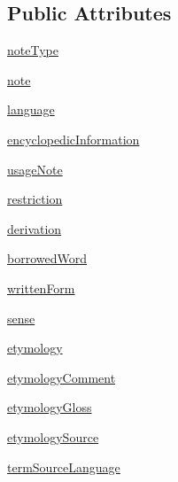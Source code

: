 \subsection*{Public Attributes}
\begin{DoxyCompactItemize}
\item 
\hyperlink{classlmf_1_1src_1_1core_1_1statement_1_1_statement_abc61d06d03119e6e12d5c3854afc93c1}{note\+Type}
\item 
\hyperlink{classlmf_1_1src_1_1core_1_1statement_1_1_statement_a231fe52b0b7ba3deb6d0993987dddaf0}{note}
\item 
\hyperlink{classlmf_1_1src_1_1core_1_1statement_1_1_statement_a71a5b6eaf4bad349ab3399fbea06b88d}{language}
\item 
\hyperlink{classlmf_1_1src_1_1core_1_1statement_1_1_statement_a3f6a8d066930ce775d6f6655ea5f3dfa}{encyclopedic\+Information}
\item 
\hyperlink{classlmf_1_1src_1_1core_1_1statement_1_1_statement_a2e146c5f5de5eed52c082c2cc0bea7d0}{usage\+Note}
\item 
\hyperlink{classlmf_1_1src_1_1core_1_1statement_1_1_statement_a812bbd34658f5bfaf3babff001be9715}{restriction}
\item 
\hyperlink{classlmf_1_1src_1_1core_1_1statement_1_1_statement_afa73464513552afc8a6bf3828446a7d9}{derivation}
\item 
\hyperlink{classlmf_1_1src_1_1core_1_1statement_1_1_statement_a534b2190fdea34d7f085a78adaac1ee2}{borrowed\+Word}
\item 
\hyperlink{classlmf_1_1src_1_1core_1_1statement_1_1_statement_a4126cee37a75d852056ae49f45cf6cc3}{written\+Form}
\item 
\hyperlink{classlmf_1_1src_1_1core_1_1statement_1_1_statement_a1670c113f5b8143803936a3958d3f256}{sense}
\item 
\hyperlink{classlmf_1_1src_1_1core_1_1statement_1_1_statement_a1232c0098a52fa5f72d6a80c8661152a}{etymology}
\item 
\hyperlink{classlmf_1_1src_1_1core_1_1statement_1_1_statement_a25f9127cf2fe1017c53a3ccb57570352}{etymology\+Comment}
\item 
\hyperlink{classlmf_1_1src_1_1core_1_1statement_1_1_statement_a7d9d96cae746848b83b4ae8516c92bee}{etymology\+Gloss}
\item 
\hyperlink{classlmf_1_1src_1_1core_1_1statement_1_1_statement_adeefdc77c6ff898b8adba4ef2a946af3}{etymology\+Source}
\item 
\hyperlink{classlmf_1_1src_1_1core_1_1statement_1_1_statement_ac334fff77caf25a783e77aa55ca3128d}{term\+Source\+Language}

\end{DoxyCompactItemize}
